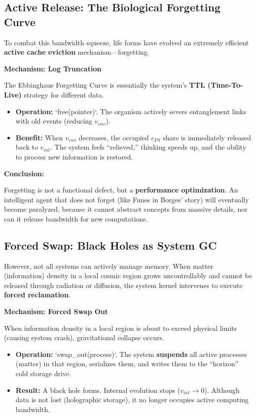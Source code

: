 \documentclass[11pt,a4paper,twoside]{book}
\begin{document}
\subsection{Active Release: The Biological Forgetting Curve}

To combat this bandwidth squeeze, life forms have evolved an extremely efficient \textbf{active cache eviction} mechanism---forgetting.

\textbf{Mechanism: Log Truncation}

The Ebbinghaus Forgetting Curve is essentially the system's \textbf{TTL (Time-To-Live)} strategy for different data.

\begin{itemize}
\item \textbf{Operation:} `free(pointer)`. The organism actively severs entanglement links with old events (reducing \textbf{$v_{env}$}).

\item \textbf{Benefit:} When \textbf{$v_{env}$} decreases, the occupied \textbf{$c_{FS}$} share is immediately released back to \textbf{$v_{int}$}. The system feels ``relieved,'' thinking speeds up, and the ability to process new information is restored.
\end{itemize}

\textbf{Conclusion:}

Forgetting is not a functional defect, but a \textbf{performance optimization}. An intelligent agent that does not forget (like Funes in Borges' story) will eventually become paralyzed, because it cannot abstract concepts from massive details, nor can it release bandwidth for new computations.

\subsection{Forced Swap: Black Holes as System GC}

However, not all systems can actively manage memory. When matter (information) density in a local cosmic region grows uncontrollably and cannot be released through radiation or diffusion, the system kernel intervenes to execute \textbf{forced reclamation}.

\textbf{Mechanism: Forced Swap Out}

When information density in a local region is about to exceed physical limits (causing system crash), gravitational collapse occurs.

\begin{itemize}
\item \textbf{Operation:} `swap\_out(process)`. The system \textbf{suspends} all active processes (matter) in that region, serializes them, and writes them to the ``horizon'' cold storage drive.

\item \textbf{Result:} A black hole forms. Internal evolution stops (\textbf{$v_{int} \to 0$}). Although data is not lost (holographic storage), it no longer occupies active computing bandwidth.
\end{itemize}
\end{document}
